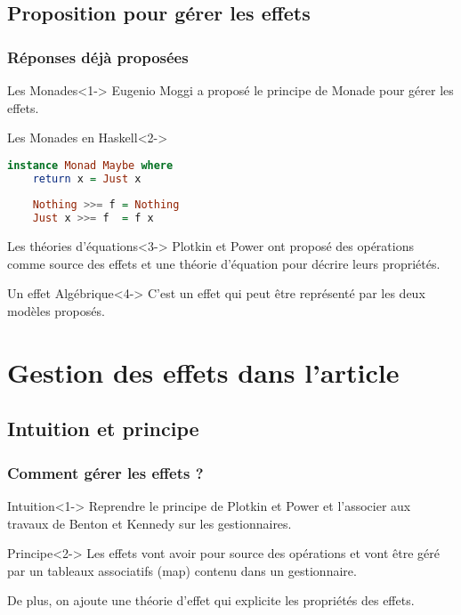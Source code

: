 \documentclass{beamer}
\begin{document}
\subsection{Proposition pour gérer les effets}
\begin{frame}[fragile]
	\frametitle{Réponses déjà proposées}

	\begin{block}{Les Monades}<1->
		Eugenio Moggi a proposé le principe de \alert{Monade} pour gérer les effets.
	\end{block}

	\begin{exampleblock}{Les Monades en Haskell}<2->
		\begin{lstlisting}[language=Haskell]
instance Monad Maybe where
	return x = Just x
			
	Nothing >>= f = Nothing
	Just x >>= f  = f x\end{lstlisting}
	\end{exampleblock}

	\begin{block}{Les théories d'équations}<3->
		Plotkin et Power ont proposé des \alert{opérations} comme source des effets et une
		\alert{théorie d'équation} pour décrire leurs propriétés.
	\end{block}

	\begin{block}{Un effet Algébrique}<4->
		C'est un effet qui peut être représenté par les deux modèles proposés.
	\end{block}
\end{frame}

\section{Gestion des effets dans l'article}

\subsection{Intuition et principe}
\begin{frame}
	\frametitle{Comment gérer les effets ?}
	\begin{block}{Intuition}<1->
		Reprendre le principe de Plotkin et Power et l'associer aux travaux de Benton et Kennedy sur
		les gestionnaires.
	\end{block}

	\begin{block}{Principe}<2->
		Les effets vont avoir pour source des \alert{opérations} et vont être géré par 
		un \alert{tableaux associatifs (map)} contenu dans un gestionnaire. 
		\smallbreak
		
		De plus, on ajoute une \alert{théorie d'effet} qui explicite les propriétés des effets.
	\end{block}
\end{frame}
\end{document}
